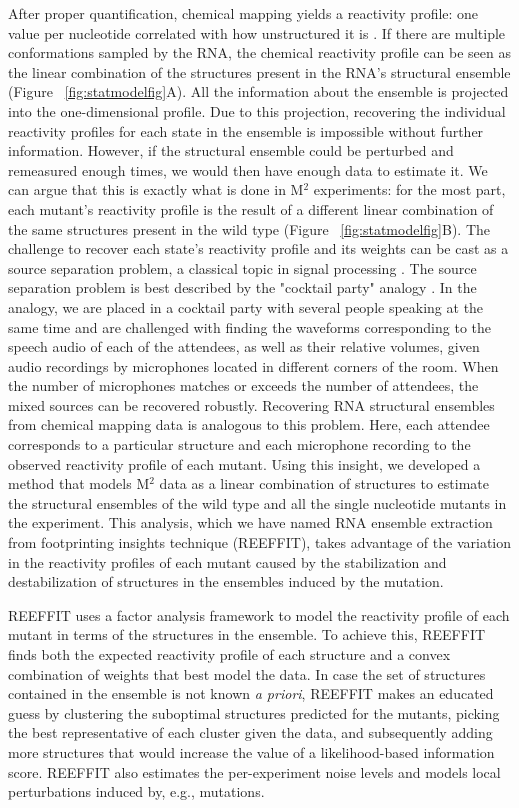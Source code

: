 \documentclass[12pt]{article}
\begin{document}
After proper quantification, chemical mapping yields a reactivity profile: one value per nucleotide correlated with how unstructured it is \cite{Mitra2008,Yoon2011}. If there are multiple conformations sampled by the RNA, the chemical reactivity profile can be seen as the linear combination of the structures present in the RNA's structural ensemble (Figure ~\ref{fig:statmodelfig}A). All the information about the ensemble is projected into the one-dimensional profile. Due to this projection, recovering the individual reactivity profiles for each state in the ensemble is impossible without further information. However, if the structural ensemble could be perturbed and remeasured enough times, we would then have enough data to estimate it. We can argue that this is exactly what is done in M$^2$ experiments: for the most part, each mutant's reactivity profile is the result of a different linear combination of the same structures present in the wild type (Figure ~\ref{fig:statmodelfig}B). The challenge to recover each state's reactivity profile and its weights can be cast as a source separation problem, a classical topic in signal processing \cite{Attias1999,Cardoso1998}. The source separation problem is best described by the "cocktail party" analogy \cite{Cardoso1998}. In the analogy, we are placed in a cocktail party with several people speaking at the same time and are challenged with finding the waveforms corresponding to the speech audio of each of the attendees, as well as their relative volumes, given audio recordings by microphones located in different corners of the room. When the number of microphones matches or exceeds the number of attendees, the mixed sources can be recovered robustly. Recovering RNA structural ensembles from chemical mapping data is analogous to this problem. Here, each attendee corresponds to a particular structure and each microphone recording to the observed reactivity profile of each mutant. Using this insight, we developed a method that models M$^2$ data as a linear combination of structures to estimate the structural ensembles of the wild type and all the single nucleotide mutants in the experiment. This analysis, which we have named RNA ensemble extraction from footprinting insights technique (REEFFIT), takes advantage of the variation in the reactivity profiles of each mutant caused by the stabilization and destabilization of structures in the ensembles induced by the mutation. 

REEFFIT uses a factor analysis framework to model the reactivity profile of each mutant in terms of the structures in the ensemble. To achieve this, REEFFIT finds both the expected reactivity profile of each structure and a convex combination of weights that best model the data. In case the set of structures contained in the ensemble is not known \textit{a priori}, REEFFIT makes an educated guess by clustering the suboptimal structures predicted for the mutants, picking the best representative of each cluster given the data, and subsequently adding more structures that would increase the value of a likelihood-based information score. REEFFIT also estimates the per-experiment noise levels and models local perturbations induced by, e.g., mutations.
\end{document}
